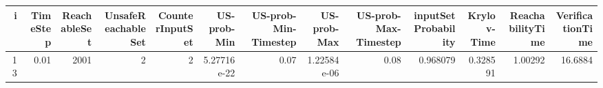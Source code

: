 \begin{tabular}{rrrrrrrrrrrrr}
\hline
   i &   TimeStep &   ReachableSet &   UnsafeReachableSet &   CounterInputSet &   US-prob-Min &   US-prob-Min-Timestep &   US-prob-Max &   US-prob-Max-Timestep &   inputSet Probability &   Krylov-Time &   ReachabilityTime &   VerificationTime \\
\hline
  13 &       0.01 &           2001 &                    2 &                 2 &   5.27716e-22 &                   0.07 &   1.22584e-06 &                   0.08 &               0.968079 &      0.328591 &            1.00292 &            16.6884 \\
\hline
\end{tabular}
